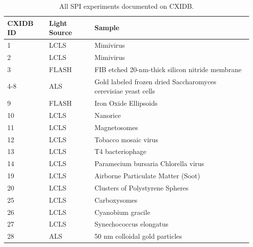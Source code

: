 \begin{table}
    \caption{All SPI experiments documented on CXIDB.}
    \label{tb: SPI experiments}
        \begin{tabularx}{\textwidth}{ l l X }
            CXIDB ID & Light Source & Sample \\
            \hline
            1        & LCLS         & Mimivirus                                                       \\
            2        & LCLS         & Mimivirus                                                       \\
            3        & FLASH        & FIB etched 20-nm-thick silicon nitride membrane                 \\
            4-8      & ALS          & Gold labeled frozen dried Saccharomyces cerevisiae yeast cells  \\
            9        & FLASH        & Iron Oxide Ellipsoids                                           \\
            10       & LCLS         & Nanorice                                                        \\
            11       & LCLS         & Magnetosomes                                                    \\
            12       & LCLS         & Tobacco mosaic virus                                            \\
            13       & LCLS         & T4 bacteriophage                                                \\
            14       & LCLS         & Paramecium bursaria Chlorella virus                             \\
            19       & LCLS         & Airborne Particulate Matter (Soot)                              \\
            20       & LCLS         & Clusters of Polystyrene Spheres                                 \\
            25       & LCLS         & Carboxysomes                                                    \\
            26       & LCLS         & Cyanobium gracile                                               \\
            27       & LCLS         & Synechococcus elongatus                                         \\
            28       & ALS          & 50 nm colloidal gold particles                                  \\

\end{tabularx}
\end{table}
